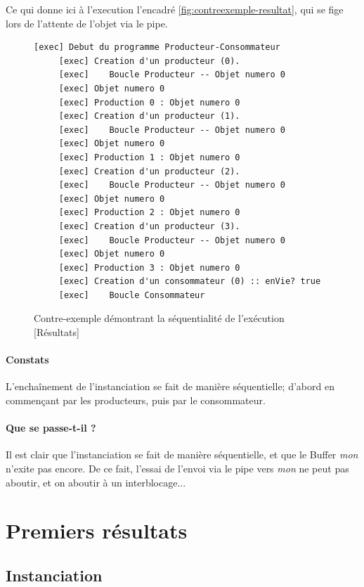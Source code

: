 \documentclass[a4paper,11pt,french]{report}
\begin{document}
Ce qui donne ici à l'execution l'encadré \vref{fig:contreexemple-resultat}, qui se fige lors de l'attente de l'objet via le pipe.

\begin{figure}[h]
\begin{lstlisting}[frame=trBL]
     [exec] Debut du programme Producteur-Consommateur
     [exec] Creation d'un producteur (0).
     [exec]    Boucle Producteur -- Objet numero 0
     [exec] Objet numero 0
     [exec] Production 0 : Objet numero 0
     [exec] Creation d'un producteur (1).
     [exec]    Boucle Producteur -- Objet numero 0
     [exec] Objet numero 0
     [exec] Production 1 : Objet numero 0
     [exec] Creation d'un producteur (2).
     [exec]    Boucle Producteur -- Objet numero 0
     [exec] Objet numero 0
     [exec] Production 2 : Objet numero 0
     [exec] Creation d'un producteur (3).
     [exec]    Boucle Producteur -- Objet numero 0
     [exec] Objet numero 0
     [exec] Production 3 : Objet numero 0
     [exec] Creation d'un consommateur (0) :: enVie? true
     [exec]    Boucle Consommateur
\end{lstlisting}
\caption{Contre-exemple démontrant la séquentialité de l'exécution [Résultats]}
\label{fig:contreexemple-resultat}
\end{figure}

\paragraph{Constats} L'encha\^inement de l'instanciation se fait de manière séquentielle; d'abord en commençant par les producteurs, puis par le consommateur.

\paragraph{Que se passe-t-il ?} Il est clair que l'instanciation se fait de manière séquentielle, et que le Buffer \textit{mon} n'exite pas encore. De ce fait, l'essai de l'envoi via le pipe vers \textit{mon} ne peut pas aboutir, et on aboutir à un interblocage...

\section{Premiers résultats}
\subsection{Instanciation}
\end{document}
